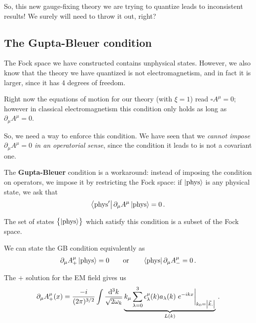 \documentclass[main.tex]{subfiles}
\begin{document}
So, this new gauge-fixing theory we are trying to quantize leads to inconsistent results! We surely will need to throw it out, right?

\subsection{The Gupta-Bleuer condition}

The Fock space we have constructed contains unphysical states. However, we also know that the theory we have quantized is not electromagnetism, and in fact it is larger, since it has 4 degrees of freedom. 

Right now the equations of motion for our theory (with \(\xi = 1\)) read \(\square A^{\mu } = 0\); however in classical electromagnetism this condition only holds as long as \(\partial_{\mu } A^{\mu } = 0\). 

So, we need a way to enforce this condition. We have seen that we \emph{cannot impose \(\partial_{\mu } A^{\mu } = 0\) in an operatorial sense}, since the condition it leads to is not a covariant one. 

The \textbf{Gupta-Bleuer} condition is a workaround: instead of imposing the condition on operators, we impose it by restricting the Fock space: if \(\ket{\text{phys}}\) is any physical state, we ask that 
%
\begin{align}
\bra{\text{phys}'} \partial_{\mu } A^{\mu } \ket{\text{phys}} =0
\,.
\end{align}

The set of states \(\qty{\ket{\text{phys}}}\) which satisfy this condition is a subset of the Fock space. 

\begin{claim}
We can state the GB condition equivalently as 
%
\begin{align}
\partial_{\mu }A^{\mu }_{+ } \ket{\text{phys}} = 0 
\qquad \text{or} \qquad
\bra{\text{phys}} \partial_{\mu }A^{\mu }_{- }  = 0 
\,.
\end{align}
\end{claim}

The \(+\) solution for the EM field gives us 
%
\begin{align}
\partial_{\mu } A^{\mu }_{+} (x) = \frac{- i}{(2 \pi )^{3/2}} 
\int \frac{ \dd[3]{k}}{\sqrt{2 \omega_{k}}} 
\underbrace{k_\mu \sum _{\lambda = 0 }^{3} \epsilon^{\mu }_{\lambda }(k) a_\lambda (k) \eval{e^{-ikx}}_{k_0 = \abs{\vec{k}.}}}_{L(k)} 
\,.
\end{align}
\end{document}
